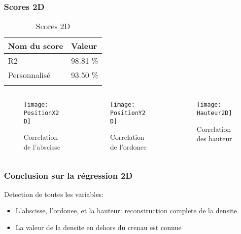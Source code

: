 \begin{frame}
    \frametitle{Scores 2D}

    \begin{table}[h!]
        \caption{Scores 2D}
        \centering
        \begin{tabular}{l l}
        \toprule
        \textbf{Nom du score} & \textbf{Valeur} \\
        \midrule
        R2 & 98.81 \%\\
        Personnalisé & 93.50 \%\\
        \bottomrule\\
        \end{tabular}
    \end{table}

    \begin{columns}
        \begin{column}{0.333\textwidth}
            \begin{figure}
            \texttt{[image: PositionX2D]}       
            \caption{Correlation de l'abscisse}
            \end{figure}
         \end{column}
         \begin{column}{0.333\textwidth}
            \begin{figure}
            \texttt{[image: PositionY2D]}       
            \caption{Correlation de l'ordonee}
            \end{figure}
         \end{column}
         \begin{column}{0.333\textwidth}
            \begin{figure}
            \texttt{[image: Hauteur2D]}       
            \caption{Correlation des hauteur}
            \end{figure}
         \end{column}
    \end{columns}

\end{frame}


\begin{frame}
    \frametitle{Conclusion sur la régression 2D}
Detection de toutes les variables:
\begin{itemize}
    \item L'abscisse, l'ordonee, et la hauteur: reconstruction complete de la densite
    \item La valeur de la densite en dehors du crenau est connue
\end{itemize}
\end{frame}

